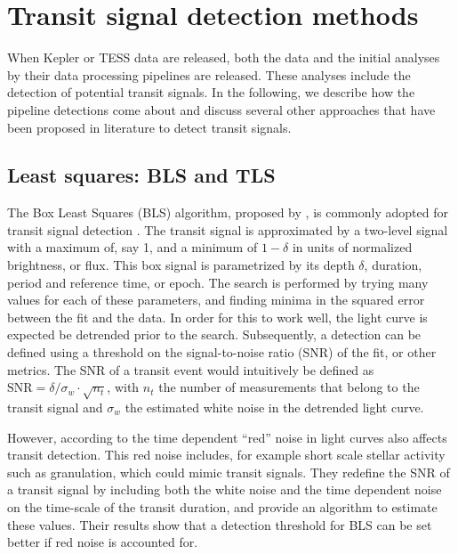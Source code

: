
\section{Transit signal detection methods}


When Kepler or TESS data are released, both the data and the initial analyses by their data processing pipelines are released. These analyses include the detection of potential transit signals. In the following, we describe how the pipeline detections come about and discuss several other approaches that have been proposed in literature to detect transit signals.

\subsection{Least squares: BLS and TLS}

The Box Least Squares (BLS) algorithm, proposed by \cite{kovacs2002box}, is commonly adopted for transit signal detection . The transit signal is approximated by a two-level signal with a maximum of, say 1, and a minimum of $1-\delta$ in units of normalized brightness, or flux. This box signal is parametrized by its depth $\delta$, duration, period and reference time, or epoch. The search is performed by trying many values for each of these parameters, and finding minima in the squared error between the fit and the data. In order for this to work well, the light curve is expected be detrended prior to the search. Subsequently, a detection can be defined using a threshold on the signal-to-noise ratio (SNR) of the fit, or other metrics. The SNR of a transit event would intuitively be defined as $\text{SNR} = \delta / \sigma_w \cdot \sqrt{n_t}$, with $n_t$ the number of measurements that belong to the transit signal and $\sigma_w$ the estimated white noise in the detrended light curve. 
    
However, according to \cite{pont2006effect} the time dependent ``red'' noise in light curves also affects transit detection. This red noise includes, for example short scale stellar activity such as granulation, which could mimic transit signals. They redefine the SNR of a transit signal by including both the white noise and the time dependent noise on the time-scale of the transit duration, and provide an algorithm to estimate these values. Their results show that a detection threshold for BLS can be set better if red noise is accounted for.

